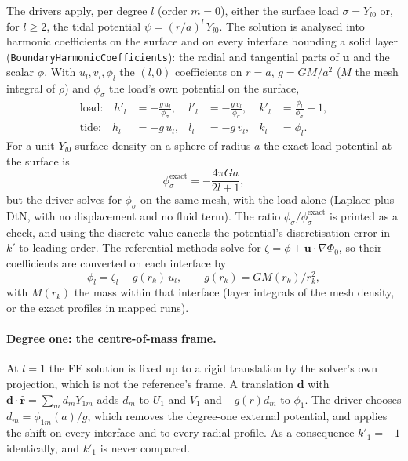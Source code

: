 \documentclass[11pt]{article}
\numberwithin{equation}{section}
\newcommand{\vu}{\mathbf{u}}
\newcommand{\rhat}{\hat{\mathbf{r}}}
\newcommand{\code}[1]{\texttt{#1}}
\begin{document}
The drivers apply, per degree $l$ (order $m=0$), either the surface load
$\sigma=Y_{l0}$ or, for $l\ge 2$, the tidal potential
$\psi=(r/a)^l\,Y_{l0}$. The solution is analysed into harmonic coefficients
on the surface and on every interface bounding a solid layer
(\code{BoundaryHarmonicCoefficients}): the radial and tangential parts of
$\vu$ and the scalar $\phi$. With $u_l,v_l,\phi_l$ the $(l,0)$ coefficients
on $r=a$, $g=GM/a^2$ ($M$ the mesh integral of $\rho$) and $\phi_\sigma$
the load's own potential on the surface,
\begin{align}
  \text{load:}\quad
    h'_l &= -\frac{g\,u_l}{\phi_\sigma}, &
    l'_l &= -\frac{g\,v_l}{\phi_\sigma}, &
    k'_l &= \frac{\phi_l}{\phi_\sigma}-1, \label{eq:loadlove}\\
  \text{tide:}\quad
    h_l &= -g\,u_l, & l_l &= -g\,v_l, & k_l &= \phi_l .
  \label{eq:tidelove}
\end{align}
For a unit $Y_{l0}$ surface density on a sphere of radius $a$ the exact
load potential at the surface is
\begin{equation}
  \phi_\sigma^{\text{exact}} = -\frac{4\pi G a}{2l+1},
  \label{eq:phisigma}
\end{equation}
but the driver solves for $\phi_\sigma$ on the same mesh, with the load
alone (Laplace plus DtN, with no displacement and no fluid term). The
ratio $\phi_\sigma/\phi_\sigma^{\text{exact}}$ is printed as a check, and
using the discrete value cancels the potential's discretisation error in
$k'$ to leading order. The referential methods solve for
$\zeta = \phi + \vu\cdot\nabla\Phi_0$, so their coefficients are converted
on each interface by
\begin{equation}
  \phi_l = \zeta_l - g(r_k)\,u_l, \qquad g(r_k)=G M(r_k)/r_k^2,
  \label{eq:zeta}
\end{equation}
with $M(r_k)$ the mass within that interface (layer integrals of the mesh
density, or the exact profiles in mapped runs).

\paragraph{Degree one: the centre-of-mass frame.}
At $l=1$ the FE solution is fixed up to a rigid translation by the
solver's own projection, which is not the reference's frame. A
translation $\mathbf{d}$ with $\mathbf{d}\cdot\rhat=\sum_m d_m Y_{1m}$ adds
$d_m$ to $U_1$ and $V_1$ and $-g(r)d_m$ to $\phi_1$. The driver chooses
$d_m=\phi_{1m}(a)/g$, which removes the degree-one external potential, and
applies the shift on every interface and to every radial profile. As a
consequence $k'_1=-1$ identically, and $k'_1$ is never compared.
\end{document}
